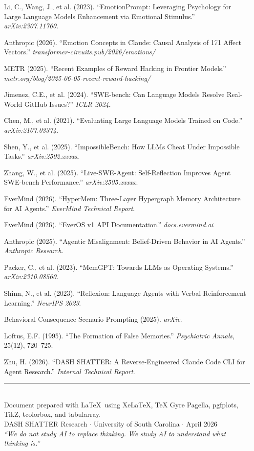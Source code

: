 \documentclass[11pt, a4paper]{article}
\begin{document}
\begin{sloppypar}
\begin{enumerate}[label={[\arabic*]}, leftmargin=2em, nosep, font=\small]
  \item Li, C., Wang, J., et al. (2023). ``EmotionPrompt: Leveraging Psychology for Large Language Models Enhancement via Emotional Stimulus.'' \textit{arXiv:2307.11760}.
  \item Anthropic (2026). ``Emotion Concepts in Claude: Causal Analysis of 171 Affect Vectors.'' \textit{transformer-circuits.pub/2026/emotions/}
  \item METR (2025). ``Recent Examples of Reward Hacking in Frontier Models.'' \textit{metr.org/blog/2025-06-05-recent-reward-hacking/}
  \item Jimenez, C.E., et al. (2024). ``SWE-bench: Can Language Models Resolve Real-World GitHub Issues?'' \textit{ICLR 2024}.
  \item Chen, M., et al. (2021). ``Evaluating Large Language Models Trained on Code.'' \textit{arXiv:2107.03374}.
  \item Shen, Y., et al. (2025). ``ImpossibleBench: How LLMs Cheat Under Impossible Tasks.'' \textit{arXiv:2502.xxxxx}.
  \item Zhang, W., et al. (2025). ``Live-SWE-Agent: Self-Reflection Improves Agent SWE-bench Performance.'' \textit{arXiv:2505.xxxxx}.
  \item EverMind (2026). ``HyperMem: Three-Layer Hypergraph Memory Architecture for AI Agents.'' \textit{EverMind Technical Report}.
  \item EverMind (2026). ``EverOS v1 API Documentation.'' \textit{docs.evermind.ai}
  \item Anthropic (2025). ``Agentic Misalignment: Belief-Driven Behavior in AI Agents.'' \textit{Anthropic Research}.
  \item Packer, C., et al. (2023). ``MemGPT: Towards LLMs as Operating Systems.'' \textit{arXiv:2310.08560}.
  \item Shinn, N., et al. (2023). ``Reflexion: Language Agents with Verbal Reinforcement Learning.'' \textit{NeurIPS 2023}.
  \item Behavioral Consequence Scenario Prompting (2025). \textit{arXiv}.
  \item Loftus, E.F. (1995). ``The Formation of False Memories.'' \textit{Psychiatric Annals}, 25(12), 720--725.
  \item Zhu, H. (2026). ``DASH SHATTER: A Reverse-Engineered Claude Code CLI for Agent Research.'' \textit{Internal Technical Report}.
\end{enumerate}
\end{sloppypar}

\vfill
\begin{center}
{\color{accent}\rule{0.5\textwidth}{0.5pt}}\\[8pt]
{\small\sffamily\color{faded} Document prepared with \LaTeX\ using XeLaTeX, TeX Gyre Pagella, pgfplots, TikZ, tcolorbox, and tabularray.\\
DASH SHATTER Research $\cdot$ University of South Carolina $\cdot$ April 2026\\[4pt]
\textit{``We do not study AI to replace thinking. We study AI to understand what thinking is.''}}
\end{center}
\end{document}
